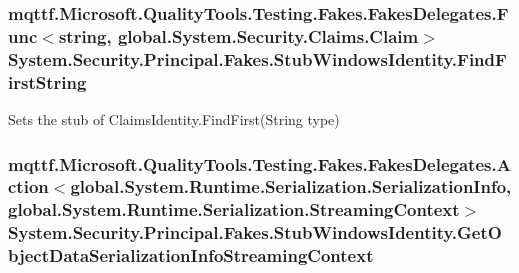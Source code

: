 \hypertarget{class_system_1_1_security_1_1_principal_1_1_fakes_1_1_stub_windows_identity_af2be028cf9216affbde2c2c48127c1f6}{
\subsubsection[{Find\-First\-String}]{\setlength{\rightskip}{0pt plus 5cm}mqttf.\-Microsoft.\-Quality\-Tools.\-Testing.\-Fakes.\-Fakes\-Delegates.\-Func$<$string, global.\-System.\-Security.\-Claims.\-Claim$>$ System.\-Security.\-Principal.\-Fakes.\-Stub\-Windows\-Identity.\-Find\-First\-String}}\label{class_system_1_1_security_1_1_principal_1_1_fakes_1_1_stub_windows_identity_af2be028cf9216affbde2c2c48127c1f6}


Sets the stub of Claims\-Identity.\-Find\-First(\-String type)

\hypertarget{class_system_1_1_security_1_1_principal_1_1_fakes_1_1_stub_windows_identity_a16b34b72ba51808f239eea54b1cdeb7f}{
\subsubsection[{Get\-Object\-Data\-Serialization\-Info\-Streaming\-Context}]{\setlength{\rightskip}{0pt plus 5cm}mqttf.\-Microsoft.\-Quality\-Tools.\-Testing.\-Fakes.\-Fakes\-Delegates.\-Action$<$global.\-System.\-Runtime.\-Serialization.\-Serialization\-Info, global.\-System.\-Runtime.\-Serialization.\-Streaming\-Context$>$ System.\-Security.\-Principal.\-Fakes.\-Stub\-Windows\-Identity.\-Get\-Object\-Data\-Serialization\-Info\-Streaming\-Context}}\label{class_system_1_1_security_1_1_principal_1_1_fakes_1_1_stub_windows_identity_a16b34b72ba51808f239eea54b1cdeb7f}


